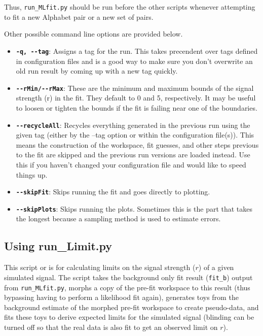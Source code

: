 \documentclass[letter]{article}
\begin{document}
        Thus, \verb"run_MLfit.py" should be run before the other scripts whenever attempting to fit a new Alphabet pair or a new set of pairs.

        Other possible command line options are provided below.

        \begin{itemize}
            \item \textbf{\verb"-q, --tag"}: Assigns a tag for the run. This takes precendent over tags defined in configuration files and is a good way to make sure you don't overwrite an old run result by coming up with a new tag quickly.
            \item \textbf{\verb"--rMin/--rMax"}: These are the minimum and maximum bounds of the signal strength (r) in the fit. They default to 0 and 5, respectively. It may be useful to loosen or tighten the bounds if the fit is failing near one of the boundaries.
            \item \textbf{\verb"--recycleAll"}: Recycles everything generated in the previous run using the given tag (either by the --tag option or within the configuration file(s)). This means the construction of the workspace, fit guesses, and other steps previous to the fit are skipped and the previous run versions are loaded instead. Use this if you haven't changed your configuration file and would like to speed things up.
            \item \textbf{\verb"--skipFit"}: Skips running the fit and goes directly to plotting.
            \item \textbf{\verb"--skipPlots"}: Skips running the plots. Sometimes this is the part that takes the longest because a sampling method is used to estimate errors.
        \end{itemize}

    \subsection{Using run\_Limit.py}
        This script or is for calculating limits on the signal strength ($r$) of a given simulated signal. The script takes the background only fit result (\verb"fit_b") output from \verb"run_MLfit.py", morphs a copy of the pre-fit workspace to this result (thus bypassing having to perform a likelihood fit again), generates toys from the background estimate of the morphed pre-fit workspace to create pseudo-data, and fits these toys to derive expected limits for the simulated signal (blinding can be turned off so that the real data is also fit to get an observed limit on $r$). 
\end{document}
